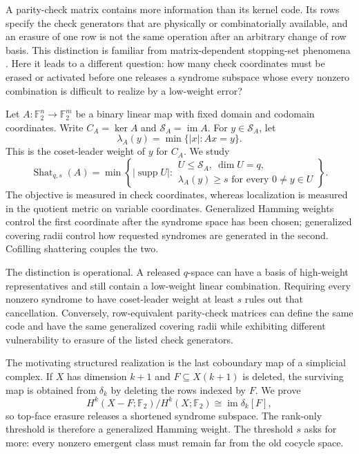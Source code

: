 \documentclass[11pt,letterpaper]{article}
\theoremstyle{plain}
\theoremstyle{definition}
\newcommand{\F}{\mathbb{F}_2}
\newcommand{\cS}{\mathcal{S}}
\newcommand{\supp}{\operatorname{supp}}
\newcommand{\im}{\operatorname{im}}
\newcommand{\Shat}{\operatorname{Shat}}
\newcommand{\1}{\mathbf{1}}
\newcommand{\abs}[1]{\left|#1\right|}
\begin{document}
A parity-check matrix contains more information than its kernel code.  Its
rows specify the check generators that are physically or combinatorially
available, and an erasure of one row is not the same operation after an
arbitrary change of row basis.  This distinction is familiar from
matrix-dependent stopping-set phenomena \cite{schwartzvardy2006}.  Here it
leads to a different question: how many check coordinates must be erased or
activated before one releases a syndrome subspace whose every nonzero
combination is difficult to realize by a low-weight error?

Let $A:\F^n\to\F^m$ be a binary linear map with fixed domain and codomain
coordinates.  Write $C_A=\ker A$ and $\cS_A=\im A$.  For $y\in\cS_A$, let
\[
 \lambda_A(y)=\min\{\abs{x}:Ax=y\}.
\]
This is the coset-leader weight of $y$ for $C_A$.  We study
\[
 \Shat_{q,s}(A)=
 \min\left\{\abs{\supp U}:
 \begin{array}{l}
 U\le \cS_A,\ \dim U=q,\\
 \lambda_A(y)\ge s\text{ for every }0\ne y\in U
 \end{array}\right\}.
\]
The objective is measured in check coordinates, whereas localization is
measured in the quotient metric on variable coordinates.  Generalized
Hamming weights control the first coordinate after the syndrome space has
been chosen; generalized covering radii control how requested syndromes are
generated in the second.  Cofilling shattering couples the two.

The distinction is operational.  A released $q$-space can have a basis of
high-weight representatives and still contain a low-weight linear
combination.  Requiring every nonzero syndrome to have coset-leader weight at
least $s$ rules out that cancellation.  Conversely, row-equivalent
parity-check matrices can define the same code and have the same generalized
covering radii while exhibiting different vulnerability to erasure of the
listed check generators.

The motivating structured realization is the last coboundary map of a
simplicial complex.  If $X$ has dimension $k+1$ and
$F\subseteq X(k+1)$ is deleted, the surviving map is obtained from
$\delta_k$ by deleting the rows indexed by $F$.  We prove
\[
 H^k(X-F;\F)/H^k(X;\F)\cong \im\delta_k[F],
\]
so top-face erasure releases a shortened syndrome subspace.  The rank-only
threshold is therefore a generalized Hamming weight.  The threshold $s$
asks for more: every nonzero emergent class must remain far from the old
cocycle space.
\end{document}

